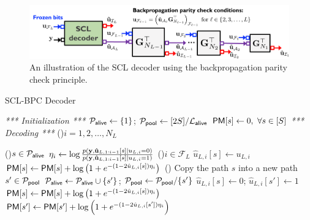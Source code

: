 \documentclass[conference]{IEEEtran}
\begin{document}
\begin{figure}[t]
\centering
\includegraphics[width=1.6\columnwidth]{Decoder1.pdf}
\caption{An illustration of the SCL decoder using the backpropagation parity check principle.}
\label{fig:decoder}
\end{figure}


\begin{algorithm}
\caption{ SCL-BPC Decoder}\label{alg:deep polar-SCL}
\vspace{0.2cm}
\emph{*** Initialization ***}\;
$\mathcal{P}_{\sf alive} \gets \{1\}$;
$\mathcal{P}_{\sf pool} \gets [2S]/\mathcal{L}_{\sf alive}$\; 
${\sf PM}[s] \gets 0, ~\forall s\in [S]$\;
\vspace{0.2cm}
\emph{*** Decoding ***}\;
\For(){$i=1,2,\ldots, N_L$}{
    \For(){$s\in \mathcal{P}_{\sf alive}$} {
        $\eta_i \gets \log \frac{ p\left({\bf y}, {\bf \hat u}_{L,1:i-1}[s] \vert u_{L,i} = 0\right) } { p\left({\bf y}, {\bf \hat u}_{L,1:i-1}[s] \vert u_{L,i} = 1\right) }$\;
        \eIf(){$i\in \mathcal{F}_{L}$}{
            ${\hat u}_{L,i}[s] \gets u_{L,i}$\;
            ${\sf PM}[s] \gets {\sf PM}[s] + \log\left(1 + e^{-(1-2{\hat u}_{L,i}[s])\eta_i}\right)$\;}
            (){
            Copy the path $s$ into a new path $s'\in \mathcal{P}_{\sf pool}$\;
            $\mathcal{P}_{\sf alive}\gets \mathcal{P}_{\sf alive} \cup \{s'\}$;
            $\mathcal{P}_{\sf pool} \gets \mathcal{P}_{\sf pool} / \{s'\}$\;
            ${\hat u}_{L,i}[s] \gets 0$; ${\hat u}_{L,i}[s'] \gets 1$\; 
            ${\sf PM}[s] \gets {\sf PM}[s] + \log\left(1 + e^{-(1-2{\hat u}_{L,i}[s])\eta_i}\right)$\;
            ${\sf PM}[s'] \gets {\sf PM}[s'] + \log\left(1 + e^{-(1-2{\hat u}_{L,i}[s'])\eta_i}\right)$\;          
        }
    }
    
}
\end{algorithm}
\end{document}
